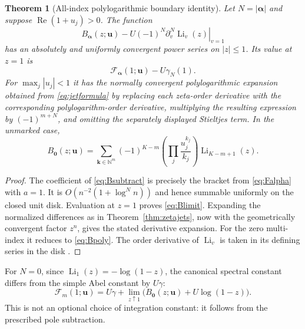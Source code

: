 \documentclass[11pt]{article}
\numberwithin{equation}{section}
\newtheorem{theorem}{Theorem}[section]
\theoremstyle{definition}\newtheorem{definition}[theorem]{Definition}
\theoremstyle{remark}\newtheorem{remark}[theorem]{Remark}
\newcommand{\Li}{\operatorname{Li}}
\newcommand{\N}{\mathbb N}
\newcommand{\Rea}{\operatorname{Re}}
\newcommand{\bu}{\boldsymbol{u}}
\newcommand{\ba}{\boldsymbol{\alpha}}
\newcommand{\bk}{\boldsymbol{k}}
\newcommand{\cF}{\mathcal F}
\begin{document}
\begin{theorem}[All-index polylogarithmic boundary identity]\label{thm:polylog}
Let $N=|\ba|$ and suppose $\Rea(1+u_j)>0$. The function
\begin{equation}\label{eq:Bsubtract}
 B_{\ba}(z;\bu)-
 U(-1)^N\left.\partial_v^N\Li_v(z)\right|_{v=1}
\end{equation}
has an absolutely and uniformly convergent power series on $|z|\le1$. Its value at $z=1$ is
\begin{equation}\label{eq:Blimit}
 \cF_{\ba}(1;\bu)-U\gamma_N(1).
\end{equation}
For $\max_j|u_j|<1$ it has the normally convergent polylogarithmic expansion obtained from \eqref{eq:jetformula} by replacing each zeta-order derivative with the corresponding polylogarithm-order derivative, multiplying the resulting expression by $(-1)^{m+N}$, and omitting the separately displayed Stieltjes term.
In the unmarked case,
\begin{equation}\label{eq:Bpoly}
 B_{\bm0}(z;\bu)=
 \sum_{\bk\in\N^m}(-1)^{K-m}
 \left(\prod_j\frac{u_j^{k_j}}{k_j}\right)\Li_{K-m+1}(z).
\end{equation}
\end{theorem}
\begin{proof}
The coefficient of \eqref{eq:Bsubtract} is precisely the bracket from \eqref{eq:Falpha} with $a=1$. It is $O(n^{-2}(1+\log^Nn))$ and hence summable uniformly on the closed unit disk. Evaluation at $z=1$ proves \eqref{eq:Blimit}. Expanding the normalized differences as in Theorem~\ref{thm:zetajets}, now with the geometrically convergent factor $z^n$, gives the stated derivative expansion. For the zero multi-index it reduces to \eqref{eq:Bpoly}. The order derivative of $\Li_v$ is taken in its defining series in the disk \cite{dlmfpolylog}.
\end{proof}

For $N=0$, since $\Li_1(z)=-\log(1-z)$, the canonical spectral constant differs from the simple Abel constant by $U\gamma$:
\begin{equation}\label{eq:Abelcorrection}
 \cF_m(1;\bu)=U\gamma+
 \lim_{z\uparrow1}\bigl(B_{\bm0}(z;\bu)+U\log(1-z)\bigr).
\end{equation}
This is not an optional choice of integration constant: it follows from the prescribed pole subtraction.
\end{document}

